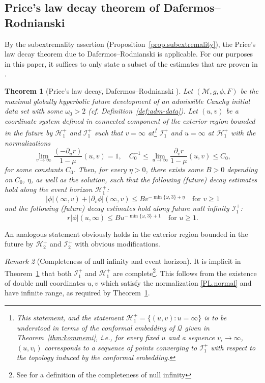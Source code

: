 \documentclass[10pt, reqno]{amsart}
\newtheorem{theorem}{Theorem}[section]
\theoremstyle{definition}
\theoremstyle{remark}
\newtheorem{remark}[theorem]{Remark}
\numberwithin{equation}{section}
\newcommand{\rd}{\partial}
\newcommand{\0}{\emptyset}
\newcommand{\omg}{\omega}
\newcommand{\calH}{\mathcal H}
\newcommand{\calI}{\mathcal I}
\newcommand{\f}{\frac}
\newcommand{\EH}{\calH^{+}}
\newcommand{\NI}{\calI^{+}}						%
\begin{document}
\subsection{Price's law decay theorem of Dafermos--Rodnianski}
By the subextremality assertion (Proposition~\ref{prop.subextremality}), the Price's law decay theorem due to Dafermos--Rodnianski is applicable. For our purposes in this paper, it suffices to only state a subset of the estimates that are proven in \cite{DRPL}.
\begin{theorem}[Price's law decay, Dafermos--Rodnianski \cite{DRPL}] \label{thm:DR-decay}
Let $(\mathcal M, g, \phi, F)$ be the maximal globally hyperbolic future development of an admissible Cauchy initial data set with some $\omg_{0} >2$ (cf. Definition~\ref{def:adm-data}). Let $(u,v)$ be a coordinate system defined in connected component of the exterior region bounded in the future by $\EH_1$ and $\NI_1$ such that $v=\infty$ at\footnote{This statement, and the statement $\EH_1=\{(u,v):u=\infty\}$ is to be understood in terms of the conformal embedding of $\mathcal Q$ given in Theorem~\ref{thm:kommemi}, i.e., for every fixed $u$ and a sequence $v_i\to \infty$, $(u,v_i)$ corresponds to a sequence of points converging to $\NI_1$ with respect to the topology induced by the conformal embedding.} $\NI_1$ and $u=\infty$ at $\EH_1$ with the normalizations
\begin{equation}\label{PL.normal}
\lim_{v\to \infty}\f{(-\rd_u r)}{1-\mu}(u,v)=1,\quad C_0^{-1}\leq \lim_{u\to \infty}\f{\rd_v r}{1-\mu}(u,v)\leq C_0, 
\end{equation}
for some constants $C_0$.
Then, for every $\eta>0$, there exists some $B>0$ depending on $C_0$, $\eta$, as well as the solution, such that the following (future) decay estimates hold along the event horizon $\EH_1$:
$$|\phi|(\infty,v)+|\rd_v\phi|(\infty,v)\leq B v^{-\min\{\omg,3\}+\eta}\quad\mbox{for }v\geq 1$$
and the following (future) decay estimates hold along future null infinity $\NI_1$:
$$r|\phi|(u,\infty)\leq B u^{-\min\{\omg, 3\}+1}\quad\mbox{for }u\geq 1.$$
\end{theorem}
An analogous statement obviously holds in the exterior region bounded in the future by $\EH_2$ and $\NI_2$ with obvious modifications.


\begin{remark}[Completeness of null infinity and event horizon]\label{rmk.completeness}
It is implicit in Theorem~\ref{thm:DR-decay} that both $\NI_1$ and $\EH_1$ are complete\footnote{See \cite{DafTrapped} for a definition of the completeness of null infinity}. This follows from the existence of double null coordinates $u, v$ which satisfy the normalization \eqref{PL.normal} and have infinite range, as required by Theorem~\ref{thm:DR-decay}.
\end{remark}
\end{document}
